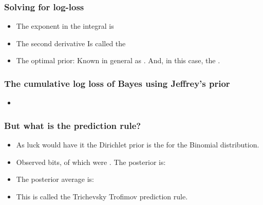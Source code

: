 \documentclass[handout]{beamer}
\begin{document}
\begin{frame}
\frametitle{Solving for log-loss}
\begin{itemize}
\item
The exponent in the integral is
\R{\[
g(\btheta,\theta) - g(\btheta,\btheta)
=
\btheta \ln {\btheta \over \theta} + 
(1-\btheta) \ln {1-\btheta \over 1-\theta}
=
D_{KL} (\btheta || \theta)
\]}
\item
The second derivative
\R{\[
\left. {d^2 \over d\theta^2} \right|_{\theta=\btheta} 
D_{KL} (\btheta || \theta) = \btheta (1-\btheta)
\]}
Is called the 
\item
The optimal prior:
\R{\[
\dweight{\btheta}{*} = \frac{1}{\pi \sqrt{\btheta (1-\btheta)}}
\]}
Known in general as .  And, in this case, 
the .
\end{itemize}
\end{frame}

\begin{frame}
\frametitle{The cumulative log loss of Bayes using Jeffrey's prior}
\begin{itemize}
\item
{}
\end{itemize}
\end{frame}

\begin{frame}
\frametitle{But what is the prediction rule?}
\begin{itemize}
\item As luck would have it the Dirichlet prior is the  for the Binomial distribution.
\item
Observed  bits,  of which were . The posterior is:
\R{\[
\frac{1}{Z \sqrt{\theta(1-\theta)}} \theta^n (1-\theta)^{t-n} 
 = 
\frac{1}{Z} \theta^{n-1/2} (1-\theta)^{t-n-1/2} 
\]}
\item
The posterior average is:
\R{\[
\frac{\int_0^1 \theta^{n+1/2} (1-\theta)^{t-n-1/2} d\theta}
{\int_0^1 \theta^{n-1/2} (1-\theta)^{t-n-1/2} d\theta}
=
\frac{n+1/2}{t+1}
\]}
\item This is called the Trichevsky Trofimov prediction rule.
\end{itemize}
\end{frame}
\end{document}

